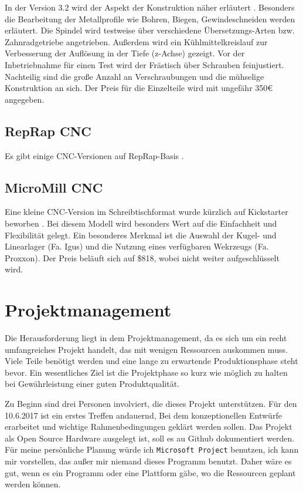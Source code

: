 \documentclass[
	a4paper,
	smallheadings,
	german,
	]
	{scrreprt}
\begin{document}
In der Version 3.2 wird der Aspekt der Konstruktion näher erläutert \autocite{:Heinz_CNC_3.2}.
Besonders die Bearbeitung der Metallprofile wie Bohren, Biegen, Gewindeschneiden werden erläutert.
Die Spindel wird testweise über verschiedene Übersetzungs-Arten bzw. Zahnradgetriebe angetrieben.
Außerdem wird ein Kühlmittelkreislauf zur Verbesserung der Auflösung in der Tiefe (z-Achse) gezeigt. 
Vor der Inbetriebnahme für einen Test wird der Frästisch über Schrauben feinjustiert.
Nachteilig sind die große Anzahl an Verschraubungen und die mühselige Konstruktion an sich.
Der Preis für die Einzelteile wird mit ungefähr 350€ angegeben. 

\section{RepRap CNC}
Es gibt einige CNC-Versionen auf RepRap-Basis \autocite{:02}.

\section{MicroMill CNC}
Eine kleine CNC-Version im Schreibtischformat wurde kürzlich auf Kickstarter beworben \autocite{:kickstarter}.
Bei diesem Modell wird besonders Wert auf die Einfachheit und Flexibilität gelegt.
Ein besonderes Merkmal ist die Auswahl der Kugel- und Linearlager (Fa. Igus) und die Nutzung eines verfügbaren Wekrzeugs (Fa. Proxxon). 
Der Preis beläuft sich auf \$818, wobei nicht weiter aufgeschlüsselt wird. 

\chapter{Projektmanagement}
Die Herausforderung liegt in dem Projektmanagement, da es sich um ein recht umfangreiches Projekt handelt, das mit wenigen Ressourcen auskommen muss.
Viele Teile benötigt werden und eine lange zu erwartende Produktionsphase steht bevor.
Ein wesentliches Ziel ist die Projektphase so kurz wie möglich zu halten bei Gewährleistung einer guten Produktqualität.

Zu Beginn sind drei Personen involviert, die dieses Projekt unterstützen.
Für den 10.6.2017 ist ein erstes Treffen andauernd, Bei dem konzeptionellen Entwürfe erarbeitet und wichtige Rahmenbedingungen geklärt werden sollen.
Das Projekt als Open Source Hardware ausgelegt ist, soll es au Github dokumentiert werden.
Für meine persönliche Planung würde ich \texttt{Microsoft Project} benutzen, ich kann mir vorstellen, das außer mir niemand dieses Programm benutzt.
Daher wäre es gut, wenn es ein Programm oder eine Plattform gäbe, wo die Ressourcen geplant werden können.
\end{document}
